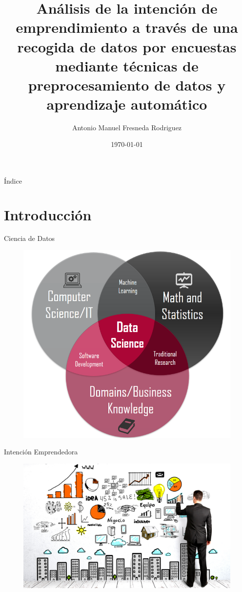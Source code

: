 \documentclass{beamer}
\title[Análisis de la intención de emprendimiento]{Análisis de la intención de emprendimiento a través de una recogida de datos por encuestas mediante técnicas de preprocesamiento de datos y aprendizaje automático}
\author{Antonio Manuel Fresneda Rodriguez}
\date{\today}
\begin{document}
	\begin{frame}
		\titlepage
	\end{frame}
	\begin{frame}{Índice}
		\tableofcontents
	\end{frame}
\section{Introducción}
		\begin{frame}{Ciencia de Datos}
			\begin{figure}
				\centering
				\includegraphics[scale=0.3]{kdd}
			\end{figure}
		\end{frame}
		\begin{frame}{Intención Emprendedora}		
			\begin{figure}
				\centering
				\includegraphics[scale=0.4]{ie}
			\end{figure}
		\end{frame}{}
\end{document}
